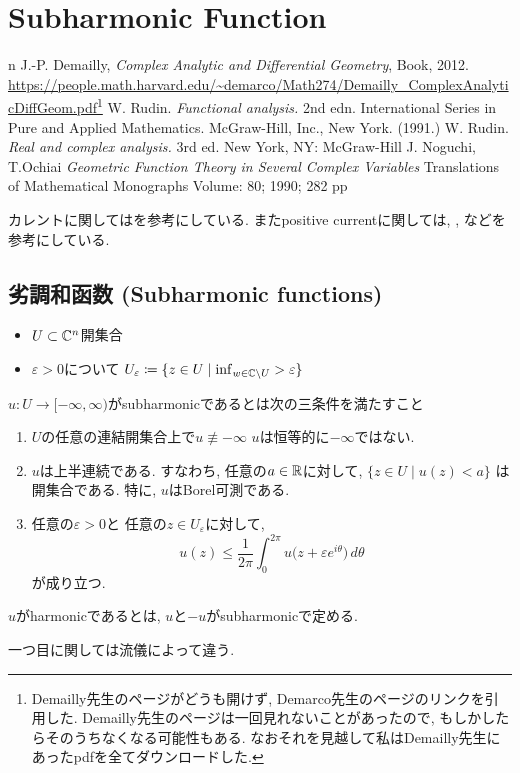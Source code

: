 \chapter{Subharmonic Function}

\begin{thebibliography}{n}
J.-P. Demailly,
\textit{Complex Analytic and Differential Geometry},
Book, 2012.
\url{https://people.math.harvard.edu/~demarco/Math274/Demailly_ComplexAnalyticDiffGeom.pdf}\footnote{Demailly先生のページがどうも開けず, Demarco先生のページのリンクを引用した. Demailly先生のページは一回見れないことがあったので, もしかしたらそのうちなくなる可能性もある. なおそれを見越して私はDemailly先生にあったpdfを全てダウンロードした.}
W. Rudin. \textit{Functional analysis.} 2nd edn. International Series in Pure and Applied Mathematics. McGraw-Hill, Inc., New York. (1991.)
W. Rudin. \textit{Real and complex analysis. } 3rd ed. New York, NY: McGraw-Hill 
J. Noguchi, T.Ochiai \textit{Geometric Function Theory in Several Complex Variables} Translations of Mathematical Monographs
Volume: 80; 1990; 282 pp
\end{thebibliography}
 
カレントに関しては\cite[Chapter 3]{NO}を参考にしている. 
またpositive currentに関しては, 
\cite[Chapter 1. Section 3.C]{Dem}, \cite[Chapter 3. Section 1.]{Dem}
などを参考にしている. 

\section{劣調和函数 (Subharmonic functions)}

\begin{itemize}
\item $U \subset \mathbb{C}^n $開集合
\item $\varepsilon >0$について
$
U_\varepsilon \coloneqq
\{ z \in U \mid\inf_{w \in \mathbb{C} \setminus U} > \varepsilon\}
$
\end{itemize}


\begin{tcolorbox}[mybox]
\begin{defn}
$u : U \to [- \infty, \infty)$がsubharmonicであるとは次の三条件を満たすこと
\begin{enumerate}
\item $U$の任意の連結開集合上で$u \not \equiv - \infty$ 
$u$は恒等的に$-\infty$ではない.

\item
$u$は上半連続である.
すなわち, 任意の$a \in \mathbb{R}$に対して,
\(
\{z \in U \mid u(z) < a\}
\)
は開集合である.
特に, $u$はBorel可測である.

\item
任意の$\varepsilon > 0$と
任意の$z \in U_\varepsilon$に対して,
\[
u(z)
\leq
\frac{1}{2\pi}
\int_0^{2\pi}
u\bigl(z+\varepsilon e^{i\theta}\bigr)\,d\theta
\]
が成り立つ.
\end{enumerate}
$u$がharmonicであるとは, $u$と$-u$がsubharmonicで定める. 
\end{defn}
\end{tcolorbox}
一つ目に関しては流儀によって違う. 


